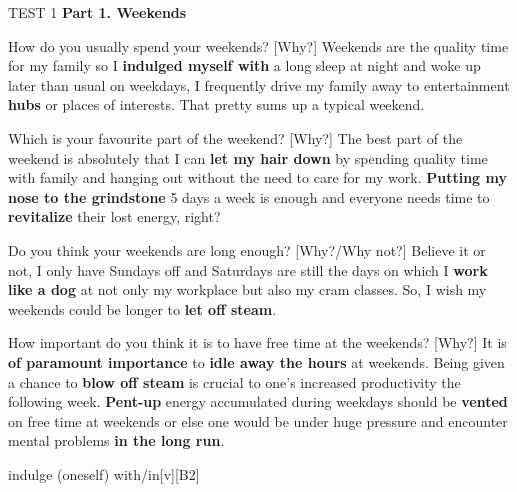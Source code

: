 \begin{glossarymc}[Cambridge 10]
    \begin{test}{TEST 1}
    \noindent
    \textbf{Part 1. Weekends}
    \begin{qa}{How do you usually spend your weekends? [Why?]}
    Weekends are the quality time for my family so I \textbf{indulged myself with} a long sleep at night and woke up later than usual on weekdays, I frequently drive my family away to entertainment \textbf{hubs} or places of interests. That pretty sums up a typical weekend.
    \end{qa}

    \begin{qa}{Which is your favourite part of the weekend? [Why?]}
    The best part of the weekend is absolutely that I can \textbf{let my hair down} by spending quality time with family and hanging out without the need to care for my work. \textbf{Putting my nose to the grindstone} 5 days a week is enough and everyone needs time to \textbf{revitalize} their lost energy, right?
    \end{qa}

    \begin{qa}{Do you think your weekends are long enough? [Why?/Why not?]}
    Believe it or not, I only have Sundays off and Saturdays are still the days on which I \textbf{work like a dog} at not only my workplace but also my cram classes. So, I wish my weekends could be longer to \textbf{let off steam}.
    \end{qa}

    \begin{qa}{How important do you think it is to have free time at the weekends? [Why?]}
    It is \textbf{of paramount importance} to \textbf{idle away the hours} at weekends. Being given a chance to \textbf{blow off steam} is crucial to one's increased productivity the following week. \textbf{Pent-up} energy accumulated during weekdays should be \textbf{vented} on free time at weekends or else one would be under huge pressure and encounter mental problems \textbf{in the long run}.
    \end{qa}

        \begin{VocabExplain}[Part 1]
            \begin{ExplainCard}{indulge (oneself) with/in}[v][B2]
            \end{ExplainCard}


\end{VocabExplain}
\end{test}
\end{glossarymc}
